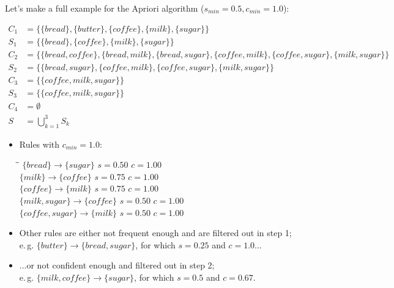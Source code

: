 \begin{frame}
\end{frame}


\begin{frame}
	Let's make a full example for the Apriori algorithm ($s_{min} = 0.5, c_{min} = 1.0$):
	
	\begin{align*}
		C_1 	&= \{ \{ bread \}, \{ butter \}, \{ coffee \}, \{ milk \}, \{ sugar \} \} \\
		S_1 	&= \{ \{ bread \}, \{ coffee \}, \{ milk \}, \{ sugar \} \} \\
		C_2 	&= \{ \{ bread, coffee \}, \{ bread, milk \}, \{ bread, sugar \}, \{ coffee, milk \}, \{ coffee, sugar \}, \{ milk, sugar \} \} \\
		S_2 	&= \{ \{ bread, sugar \}, \{ coffee, milk \}, \{ coffee, sugar \}, \{ milk, sugar \} \} \\
		C_3 	&= \{ \{ coffee, milk, sugar \} \} \\
		S_3 	&= \{ \{ coffee, milk, sugar \} \} \\
		C_4 	&= \emptyset \\
		S 	&= \bigcup_{k=1}^3 S_k
	\end{align*}
\end{frame}


\begin{frame}
	\begin{itemize}
		\item Rules with $c_{min} = 1.0$:
		\begin{tabbing}
			\hspace*{5cm}\=\hspace*{3cm}\=\kill
			$\{ bread \} \rightarrow \{ sugar \}$		\>	$s = 0.50$		\>	$c = 1.00$ 	\\[1.5mm]
			$\{ milk \} \rightarrow \{ coffee \}$		\>	$s = 0.75$		\>	$c = 1.00$ 	\\[1.5mm]
			$\{ coffee \} \rightarrow \{ milk \}$ 		\>	$s = 0.75$		\>	$c = 1.00$		\\[1.5mm]
			$\{ milk, sugar \} \rightarrow \{ coffee \}$	\>	$s = 0.50$		\>	$c = 1.00$		\\[1.5mm]
			$\{ coffee, sugar \} \rightarrow \{ milk \}$	\>	$s = 0.50$		\>	$c = 1.00$
		\end{tabbing}
		\item Other rules are either not frequent enough and are filtered out in step 1; \\
			e.\,g. $\{ butter \} \rightarrow \{ bread, sugar \}$, for which $s = 0.25$ and $c = 1.0$...
		\item ...or not confident enough and filtered out in step 2; \\
			e.\,g. $\{ milk, coffee \} \rightarrow \{ sugar \}$, for which $s = 0.5$ and $c = 0.67$.
	\end{itemize}
\end{frame}



